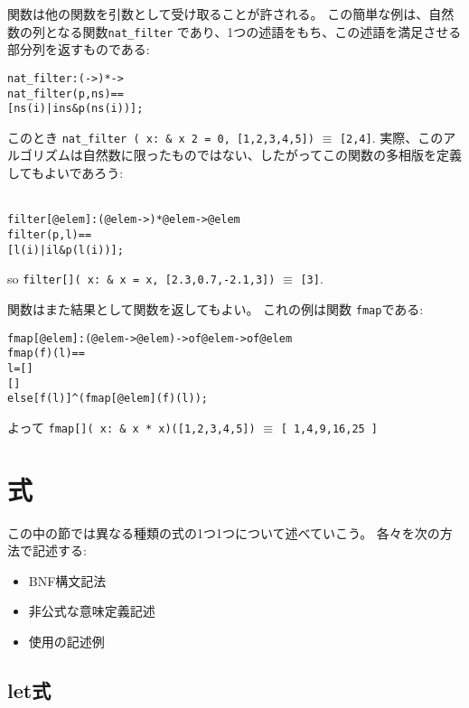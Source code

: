 \documentclass[\pformat,12pt]{jarticle}
\begin{document}
関数は他の関数を引数として受け取ることが許される。
この簡単な例は、自然数の列となる関数\texttt{nat\_filter} であり、1つの述語をもち、この述語を満足させる部分列を返すものである:
\begin{alltt}
  nat_filter : ( -> ) *  -> 
  nat_filter (p,ns) ==
    [ns(i) | i  ns & p(ns(i))];
\end{alltt}
このとき 
  \texttt{nat\_filter ( x: \& x  2 = 0, [1,2,3,4,5])} $\equiv$ \texttt{[2,4]}.
実際、このアルゴリズムは自然数に限ったものではない、したがってこの関数の多相版を定義してもよいであろう:
\begin{alltt}\label{filterdef}
  filter[@elem]: (@elem -> ) *  @elem ->  @elem
  filter (p,l) ==
    [l(i) | i  l & p(l(i))];
\end{alltt}
so \texttt{filter[]( x: \&
   x = x, [2.3,0.7,-2.1,3])} $\equiv$  \texttt{[3]}.

関数はまた結果として関数を返してもよい。
これの例は関数 \texttt{fmap}である:
\begin{alltt}
  fmap[@elem]: (@elem -> @elem) ->  of @elem ->  of @elem
  fmap (f)(l) ==
     l = []
     []
    else [f( l)]\verb+^+(fmap[@elem] (f)( l));
\end{alltt}
よって 
 \texttt{fmap[]( x: \& x * x)([1,2,3,4,5])} $\equiv$ 
\texttt{[ 1,4,9,16,25 ]}
\section{式}

この中の節では異なる種類の式の1つ1つについて述べていこう。
各々を次の方法で記述する:
\begin{itemize}
\item BNF構文記法
\item 非公式な意味定義記述
\item 使用の記述例
\end{itemize}

\subsection{let式}\label{let-exp}
\end{document}
